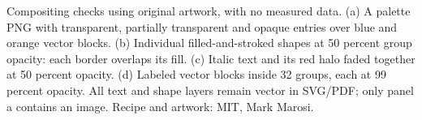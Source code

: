 \caption{Compositing checks using original artwork, with no measured data. (a) A palette PNG with transparent, partially transparent and opaque entries over blue and orange vector blocks. (b) Individual filled-and-stroked shapes at 50 percent group opacity: each border overlaps its fill. (c) Italic text and its red halo faded together at 50 percent opacity. (d) Labeled vector blocks inside 32 groups, each at 99 percent opacity. All text and shape layers remain vector in SVG/PDF; only panel a contains an image. Recipe and artwork: MIT, Mark Marosi.}
